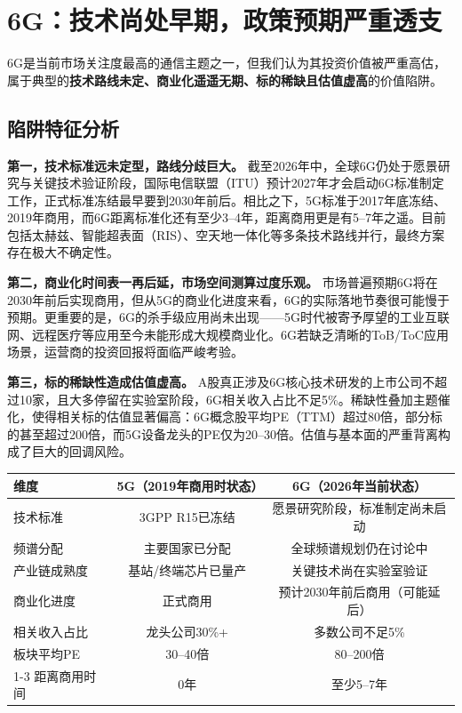 \section{6G：技术尚处早期，政策预期严重透支}

6G是当前市场关注度最高的通信主题之一，但我们认为其投资价值被严重高估，属于典型的\textbf{技术路线未定、商业化遥遥无期、标的稀缺且估值虚高}的价值陷阱。

\subsection{陷阱特征分析}

\textbf{第一，技术标准远未定型，路线分歧巨大。} 截至2026年中，全球6G仍处于愿景研究与关键技术验证阶段，国际电信联盟（ITU）预计2027年才会启动6G标准制定工作，正式标准冻结最早要到2030年前后。相比之下，5G标准于2017年底冻结、2019年商用，而6G距离标准化还有至少3--4年，距离商用更是有5--7年之遥。目前包括太赫兹、智能超表面（RIS）、空天地一体化等多条技术路线并行，最终方案存在极大不确定性。

\textbf{第二，商业化时间表一再后延，市场空间测算过度乐观。} 市场普遍预期6G将在2030年前后实现商用，但从5G的商业化进度来看，6G的实际落地节奏很可能慢于预期。更重要的是，6G的杀手级应用尚未出现——5G时代被寄予厚望的工业互联网、远程医疗等应用至今未能形成大规模商业化。6G若缺乏清晰的ToB/ToC应用场景，运营商的投资回报将面临严峻考验。

\textbf{第三，标的稀缺性造成估值虚高。} A股真正涉及6G核心技术研发的上市公司不超过10家，且大多停留在实验室阶段，6G相关收入占比不足5\%。稀缺性叠加主题催化，使得相关标的估值显著偏高：6G概念股平均PE（TTM）超过80倍，部分标的甚至超过200倍，而5G设备龙头的PE仅为20--30倍。估值与基本面的严重背离构成了巨大的回调风险。

\begin{exhibitbox}[表 7-1：5G与6G商业化进度对比]
\label{tab:5g-6g-comparison}
\centering
\small
\begin{tabularx}{\textwidth}{X c c}
\toprule
\textbf{维度} & \textbf{5G（2019年商用时状态）} & \textbf{6G（2026年当前状态）} \\
\midrule
技术标准 & 3GPP R15已冻结 & 愿景研究阶段，标准制定尚未启动 \\
频谱分配 & 主要国家已分配 & 全球频谱规划仍在讨论中 \\
产业链成熟度 & 基站/终端芯片已量产 & 关键技术尚在实验室验证 \\
商业化进度 & 正式商用 & 预计2030年前后商用（可能延后） \\
相关收入占比 & 龙头公司30\%+ & 多数公司不足5\% \\
板块平均PE & 30--40倍 & 80--200倍 \\
\cmidrule(lr){1-3}
距离商用时间 & 0年 & 至少5--7年 \\
\bottomrule
\end{tabularx}
\end{exhibitbox}

